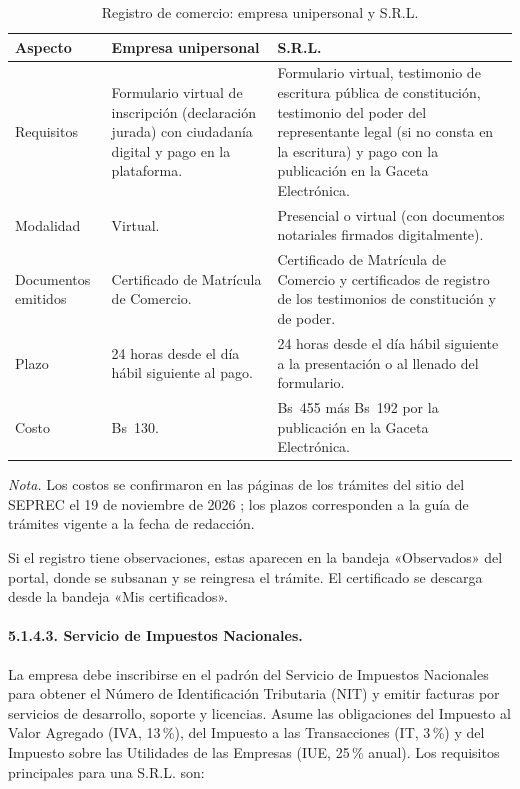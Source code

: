 \begin{table}[H]
\centering
\caption{Registro de comercio: empresa unipersonal y S.R.L.}
\label{tab:seprec}
\small
\begin{tabular}{@{}p{2.6cm}p{5.6cm}p{5.6cm}@{}}
\toprule
\textbf{Aspecto} & \textbf{Empresa unipersonal} & \textbf{S.R.L.} \\
\midrule
Requisitos & Formulario virtual de inscripción (declaración jurada) con ciudadanía digital y pago en la plataforma. & Formulario virtual, testimonio de escritura pública de constitución, testimonio del poder del representante legal (si no consta en la escritura) y pago con la publicación en la Gaceta Electrónica. \\
Modalidad & Virtual. & Presencial o virtual (con documentos notariales firmados digitalmente). \\
Documentos emitidos & Certificado de Matrícula de Comercio. & Certificado de Matrícula de Comercio y certificados de registro de los testimonios de constitución y de poder. \\
Plazo & 24 horas desde el día hábil siguiente al pago. & 24 horas desde el día hábil siguiente a la presentación o al llenado del formulario. \\
Costo & Bs~130. & Bs~455 más Bs~192 por la publicación en la Gaceta Electrónica. \\
\bottomrule
\end{tabular}

\vspace{2pt}
\footnotesize\textit{Nota.} Los costos se confirmaron en las páginas de los trámites del sitio del SEPREC el 19 de noviembre de 2026 \parencite{seprec2026}; los plazos corresponden a la guía de trámites vigente a la fecha de redacción.
\end{table}

Si el registro tiene observaciones, estas aparecen en la bandeja «Observados» del portal, donde se subsanan y se reingresa el trámite. El certificado se descarga desde la bandeja «Mis certificados».

\paragraph{5.1.4.3. Servicio de Impuestos Nacionales.}

La empresa debe inscribirse en el padrón del Servicio de Impuestos Nacionales \parencite{sin2026} para obtener el Número de Identificación Tributaria (NIT) y emitir facturas por servicios de desarrollo, soporte y licencias. Asume las obligaciones del Impuesto al Valor Agregado (IVA, 13\,\%), del Impuesto a las Transacciones (IT, 3\,\%) y del Impuesto sobre las Utilidades de las Empresas (IUE, 25\,\% anual). Los requisitos principales para una S.R.L. son:

